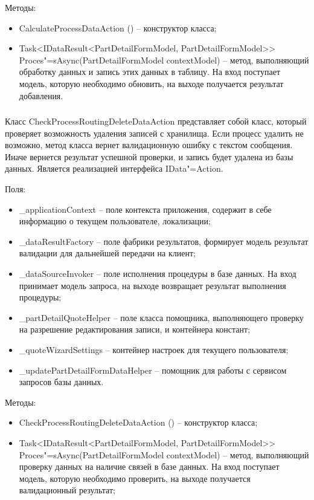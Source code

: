 Методы:
\begin{itemize}
  \item CalculateProcessDataAction () – конструктор класса;
  \item Task<IDataResult<PartDetailFormModel, PartDetailFormModel>> Proces"=sAsync(PartDetailFormModel contextModel) – метод, выполняющий обработку данных и запись этих данных в таблицу. На вход поступает модель, которую необходимо обновить, на выходе получается результат добавления.
\end{itemize}

\subsubsection{}
\label{sub:arch_and_mod:data_layer:check_process_routing_delete}

Класс CheckProcessRoutingDeleteDataAction представляет собой класс, который проверяет возможность удаления записей с хранилища. Если процесс удалить не возможно, метод класса вернет валидационную ошибку с текстом сообщения. Иначе вернется результат успешной проверки, и запись будет удалена из базы данных. Является реализацией интерфейса IData"=Action.

Поля:
\begin{itemize}
  \item \_applicationContext – поле контекста приложения, содержит в себе информацию о текущем пользователе, локализации;
  \item \_dataResultFactory – поле фабрики результатов, формирует модель результат валидации для дальнейшей передачи на клиент;
  \item \_dataSourceInvoker – поле исполнения процедуры в базе данных. На вход принимает модель запроса, на выходе возвращает результат выполнения процедуры;
  \item \_partDetailQuoteHelper – поле класса помощника, выполняющего проверку на разрешение редактирования записи, и контейнера констант;
  \item \_quoteWizardSettings – контейнер настроек для текущего пользователя;
  \item \_updatePartDetailFormDataHelper – помощник для работы с сервисом запросов базы данных.
\end{itemize}

Методы:
\begin{itemize}
  \item CheckProcessRoutingDeleteDataAction () – конструктор класса;
  \item Task<IDataResult<PartDetailFormModel, PartDetailFormModel>> Proces"=sAsync(PartDetailFormModel contextModel) – метод, выполняющий проверку данных на наличие связей в базе данных. На вход поступает модель, которую необходимо проверить, на выходе получается валидационный результат;
\end{itemize}

